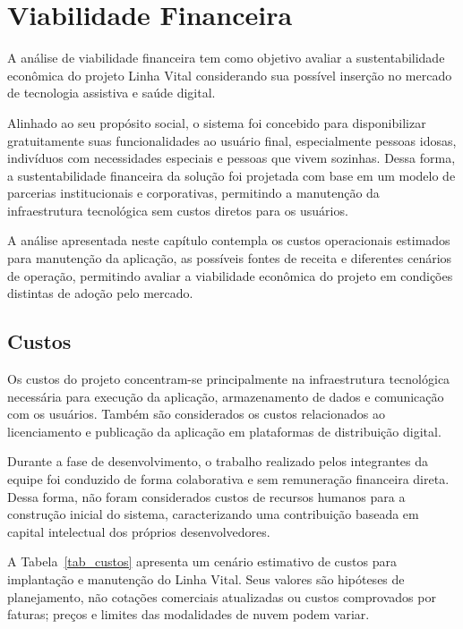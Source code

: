 \chapter{Viabilidade Financeira}

A análise de viabilidade financeira tem como objetivo avaliar a sustentabilidade econômica do projeto Linha Vital considerando sua possível inserção no mercado de tecnologia assistiva e saúde digital.

Alinhado ao seu propósito social, o sistema foi concebido para disponibilizar gratuitamente suas funcionalidades ao usuário final, especialmente pessoas idosas, indivíduos com necessidades especiais e pessoas que vivem sozinhas. Dessa forma, a sustentabilidade financeira da solução foi projetada com base em um modelo de parcerias institucionais e corporativas, permitindo a manutenção da infraestrutura tecnológica sem custos diretos para os usuários.

A análise apresentada neste capítulo contempla os custos operacionais estimados para manutenção da aplicação, as possíveis fontes de receita e diferentes cenários de operação, permitindo avaliar a viabilidade econômica do projeto em condições distintas de adoção pelo mercado.

\section{Custos}

Os custos do projeto concentram-se principalmente na infraestrutura tecnológica necessária para execução da aplicação, armazenamento de dados e comunicação com os usuários. Também são considerados os custos relacionados ao licenciamento e publicação da aplicação em plataformas de distribuição digital.

Durante a fase de desenvolvimento, o trabalho realizado pelos integrantes da equipe foi conduzido de forma colaborativa e sem remuneração financeira direta. Dessa forma, não foram considerados custos de recursos humanos para a construção inicial do sistema, caracterizando uma contribuição baseada em capital intelectual dos próprios desenvolvedores.

A Tabela~\ref{tab_custos} apresenta um cenário estimativo de custos para implantação e manutenção do Linha Vital. Seus valores são hipóteses de planejamento, não cotações comerciais atualizadas ou custos comprovados por faturas; preços e limites das modalidades de nuvem podem variar.

